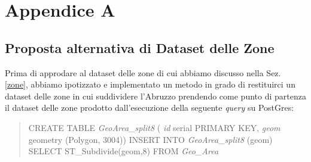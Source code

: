 \chapter{Appendice A}
\label{appendiceA}
\section{Proposta alternativa di Dataset delle Zone}
\label{nostraProposta}
Prima di approdare al dataset delle zone di cui abbiamo discusso nella Sez. \ref{zone}, abbiamo ipotizzato e implementato un metodo in grado di restituirci un dataset delle zone in cui suddividere l'Abruzzo prendendo come punto di partenza il dataset delle zone prodotto dall'esecuzione della seguente \textit{query} su PostGres:
\begin{quote}
CREATE TABLE \textit{GeoArea\_split8} (
\newline
\textit{id} serial PRIMARY KEY,
\newline
\textit{geom} geometry (Polygon, 3004))
\newline
\newline
INSERT INTO \textit{GeoArea\_split8} (geom) 
\newline
SELECT ST\_Subdivide(geom,8)
\newline
FROM \textit{Geo\_Area}
\end{quote}

